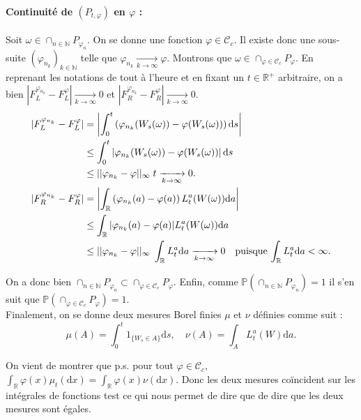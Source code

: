 \documentclass[openany]{book}
\makeatletter
\renewcommand{\P}{\mathds{P}}
\newcommand{\R}{\mathbb{R}}
\newcommand{\1}{\mathbbm{1}}
\newcommand{\refocc}{\hyperref[eq:occupation]{$(P_{t,\varphi})$}}
\renewcommand{\d}{\mathrm{d}}
\renewenvironment{proof}[1][\textbf{\textit{Démonstration}}]{%
  \par\pushQED{\qed}%
  \normalfont\topsep6\p@\@plus6\p@\relax
  \trivlist\item[\hskip\labelsep
    #1\@addpunct{.}]\ignorespaces
}{%
  \popQED\endtrivlist\@endpefalse
}
\theoremstyle{thmfont}
\theoremstyle{deffont}
\theoremstyle{thmfont}
\theoremstyle{deffont}
\makeatother
\begin{document}
\begin{proof}
 \noindent \paragraph{Continuité de \refocc \; en $\varphi$ :}

  Soit $\omega \in \cap_{n\in \mathbb N}P_{\varphi_n}$. On se donne une fonction $\varphi \in \mathcal C_c$. Il existe donc une sous-suite $(\varphi_{n_k})_{k\in\mathbb N}$ telle que $\varphi_{n_k} \xrightarrow[k \to \infty]{} \varphi$. Montrons que $\omega \in \cap_{\varphi \in \mathcal C_c} P_\varphi$. En reprenant les notations de tout à l'heure et en fixant un $t \in \R^+$ arbitraire, on a bien $|F_L^{\varphi_{n_k}} - F_L^\varphi|\xrightarrow[k \to \infty]{} 0$ et $|F_R^{\varphi_{n_k}} - F_R^\varphi|\xrightarrow[k \to \infty]{} 0$.
%
\begin{align*}
  |F_L^{\varphi_{n_k}} - F_L^\varphi| &= \left|\int_0^t \left( \varphi_{n_k}(W_s(\omega)) - \varphi(W_s(\omega))\right)\d s\right|\\
                        &\leq \int_0^t \left| \varphi_{n_k}(W_s(\omega)) - \varphi(W_s(\omega))\right|\d s\\
                        &\leq ||\varphi_{n_k} - \varphi||_{\infty} \;t \xrightarrow[k \to \infty]{} 0.\\
  \vspace{4mm}
  |F_R^{\varphi_{n_k}} - F_R^\varphi| &= \left|\int_\R \left( \varphi_{n_k}(a) - \varphi(a)\right) L_t^a(W(\omega))\d a\right|\\
                          &\leq \int_\R |\varphi_{n_k}(a) - \varphi(a)| L_t^a(W(\omega))\d a\\
                          &\leq ||\varphi_{n_k} - \varphi||_\infty \; \int_\R L_t^a\d a \xrightarrow[k\to \infty]{} 0\quad\text{puisque $\int_\R L_t^a\d a < \infty$.}
\end{align*}

\noindent On a donc bien $\cap_{n\in \mathbb N} P_{\varphi_n} \subset \cap_{\varphi \in \mathcal C_c} P_\varphi$. Enfin, comme $\P(\cap_{n\in \mathbb N} P_{\varphi_n}) = 1$ il s'en suit que $\P(\cap_{\varphi \in \mathcal C_c} P_\varphi) = 1$.\\


 Finalement, on se donne deux mesures Borel finies $\mu$ et $\nu$ définies comme suit :
$$  \mu(A) = \int_0^t 1_{\{W_s \in A\}}\d s,\quad
\nu(A) = \int_A L_t^a(W) \d a.$$

\noindent On vient de montrer que p.s. pour tout $\varphi \in \mathcal C_c$, $\int_\R \varphi(x) \mu_t(\d x) = \int_\R \varphi(x) \nu(\d x).$ Donc les deux mesures coïncident sur les intégrales de fonctions test ce qui nous permet de dire que de dire que les deux mesures sont égales.
\end{proof}
\end{document}
